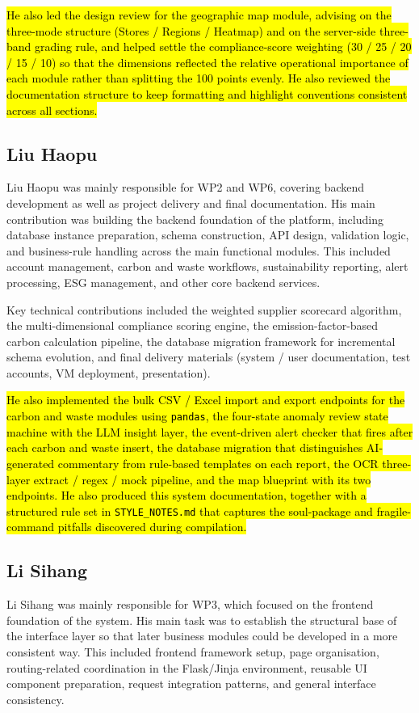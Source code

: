 \documentclass[11pt,a4paper]{article}
\newcommand{\new}[1]{\hl{#1}}
\begin{document}
\new{He also led the design review for the geographic map module, advising on the three-mode structure (Stores / Regions / Heatmap) and on the server-side three-band grading rule, and helped settle the compliance-score weighting (30 / 25 / 20 / 15 / 10) so that the dimensions reflected the relative operational importance of each module rather than splitting the 100 points evenly. He also reviewed the documentation structure to keep formatting and highlight conventions consistent across all sections.}

\subsection{Liu Haopu}
Liu Haopu was mainly responsible for WP2 and WP6, covering backend development as well as project delivery and final documentation. His main contribution was building the backend foundation of the platform, including database instance preparation, schema construction, API design, validation logic, and business-rule handling across the main functional modules. This included account management, carbon and waste workflows, sustainability reporting, alert processing, ESG management, and other core backend services.

Key technical contributions included the weighted supplier scorecard algorithm, the multi-dimensional compliance scoring engine, the emission-factor-based carbon calculation pipeline, the database migration framework for incremental schema evolution, and final delivery materials (system / user documentation, test accounts, VM deployment, presentation).

\new{He also implemented the bulk CSV / Excel import and export endpoints for the carbon and waste modules using \texttt{pandas}, the four-state anomaly review state machine with the LLM insight layer, the event-driven alert checker that fires after each carbon and waste insert, the database migration that distinguishes AI-generated commentary from rule-based templates on each report, the OCR three-layer extract / regex / mock pipeline, and the map blueprint with its two endpoints. He also produced this system documentation, together with a structured rule set in \texttt{STYLE\_NOTES.md} that captures the soul-package and fragile-command pitfalls discovered during compilation.}

\subsection{Li Sihang}
Li Sihang was mainly responsible for WP3, which focused on the frontend foundation of the system. His main task was to establish the structural base of the interface layer so that later business modules could be developed in a more consistent way. This included frontend framework setup, page organisation, routing-related coordination in the Flask/Jinja environment, reusable UI component preparation, request integration patterns, and general interface consistency.
\end{document}
